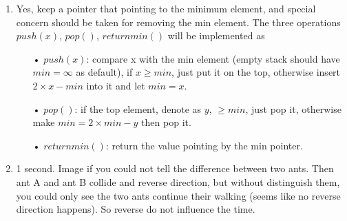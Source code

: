 \documentclass{assignment}
\begin{document}
    \begin{homeworkProblem}
    
    \begin{enumerate}
    \item Yes, keep a pointer that pointing to the minimum element, and special concern should be taken for removing the min element. The three operations $push(x)$, $pop()$, $returnmin()$ will be implemented as 
    \begin{enumerate}
    \item[•] $push(x)$: compare x with the min element (empty stack should have $min=\infty$ as default), if $x\geq min$, just put it on the top, otherwise insert $2\times x - min$ into it and let $min = x$.
    \item[•] $pop()$: if the top element, denote as $y$, $\geq min$, just pop it, otherwise make $min=2\times min - y$  then pop it. 
    \item[•] $returnmin()$: return the value pointing by the min pointer. 
    \end{enumerate}
    \item 1 second. Image if you could not tell the difference between two ants. Then ant A and ant B collide and reverse direction, but without distinguish them, you could only see the two ants continue their walking (seems like no reverse direction happens). So reverse do not influence the time. 
    \end{enumerate}
    
    \end{homeworkProblem}
    
\end{document}
